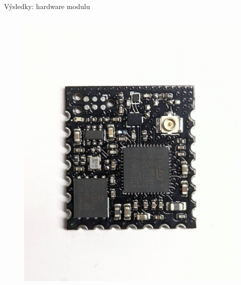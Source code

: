 \documentclass{beamer}
\begin{document}
\begin{frame}{Výsledky: hardware modulu}
\begin{columns}[T]
\begin{column}{.55\textwidth}
\begin{figure}[h]
        \includegraphics[width=\linewidth]{img/module.jpg}
    \end{figure}
\end{column}%
\end{columns}
\end{frame}
\end{document}
